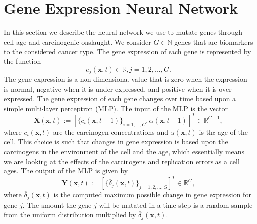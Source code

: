 \documentclass[\main/thesis.tex]{subfiles}
\begin{document}
\section{Gene Expression Neural Network}
In this section we describe the neural network we use to mutate genes through cell age and carcinogenic onslaught. We consider $G {\in} \mathbb{N}$ genes that are biomarkers to the considered cancer type. The gene expression of each gene is represented by the function
\begin{equation}
e_j(\boldsymbol{x}, t) {\in} \mathbb{R}, j {=} 1, 2, ..., G.
\label{eq:geneExprFunc}
\end{equation}
The gene expression is a non-dimensional value that is zero when the expression is normal, negative when it is under-expressed, and positive when it is over-expressed. 
The gene expression of each gene changes over time based upon a simple multi-layer perceptron (MLP). The input of the MLP is the vector
\begin{equation}
\boldsymbol{X}(\boldsymbol{x}, t) {:=} 
  [
    \{ c_i(\boldsymbol{x}, t {-} 1) \}_{i {=} 1,...,C},
    \alpha(\boldsymbol{x}, t {-} 1)
  ]^T 
{\in} \mathbb{R}_+^{C {+} 1},
\label{eq:geneExprNN_InputVector}
\end{equation}
where $c_i(\boldsymbol{x}, t)$ are the carcinogen concentrations and $\alpha(\boldsymbol{x}, t)$ is the age of the cell. This choice is such that changes in gene expression is based upon the carcinogens in the environment of the cell and the age, which essentially means we are looking at the effects of the carcinogens and replication errors as a cell ages. The output of the MLP is given by
\begin{equation}
\boldsymbol{Y}(\boldsymbol{x}, t) {:=} [ \{ \overline{\delta}_j(\boldsymbol{x}, t) \}_{j {=} 1, 2, ..., G} ]^T
{\in} \mathbb{R}^{G},
\label{eq:geneExprNN_OutputVector}
\end{equation}
where $\overline{\delta}_j(\boldsymbol{x}, t)$ is the computed maximum possible change in gene expression for gene $j$. The amount the gene $j$ will be mutated in a time-step is a random sample from the uniform distribution multiplied by $\overline{\delta}_j(\boldsymbol{x}, t)$. 
\end{document}
